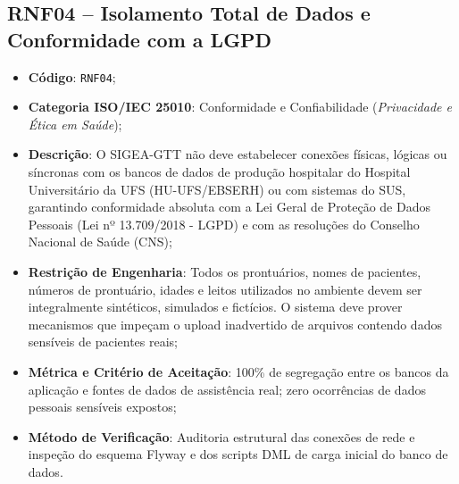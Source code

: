 \subsection{RNF04 -- Isolamento Total de Dados e Conformidade com a LGPD}
\begin{itemize}
    \item \textbf{Código}: \texttt{RNF04};
    \item \textbf{Categoria ISO/IEC 25010}: Conformidade e Confiabilidade (\textit{Privacidade e Ética em Saúde});
    \item \textbf{Descrição}: O SIGEA-GTT não deve estabelecer conexões físicas, lógicas ou síncronas com os bancos de dados de produção hospitalar do Hospital Universitário da UFS (HU-UFS/EBSERH) ou com sistemas do SUS, garantindo conformidade absoluta com a Lei Geral de Proteção de Dados Pessoais (Lei nº 13.709/2018 - LGPD) e com as resoluções do Conselho Nacional de Saúde (CNS);
    \item \textbf{Restrição de Engenharia}: Todos os prontuários, nomes de pacientes, números de prontuário, idades e leitos utilizados no ambiente devem ser integralmente sintéticos, simulados e fictícios. O sistema deve prover mecanismos que impeçam o upload inadvertido de arquivos contendo dados sensíveis de pacientes reais;
    \item \textbf{Métrica e Critério de Aceitação}: 100\% de segregação entre os bancos da aplicação e fontes de dados de assistência real; zero ocorrências de dados pessoais sensíveis expostos;
    \item \textbf{Método de Verificação}: Auditoria estrutural das conexões de rede e inspeção do esquema Flyway e dos scripts DML de carga inicial do banco de dados.
\end{itemize}


